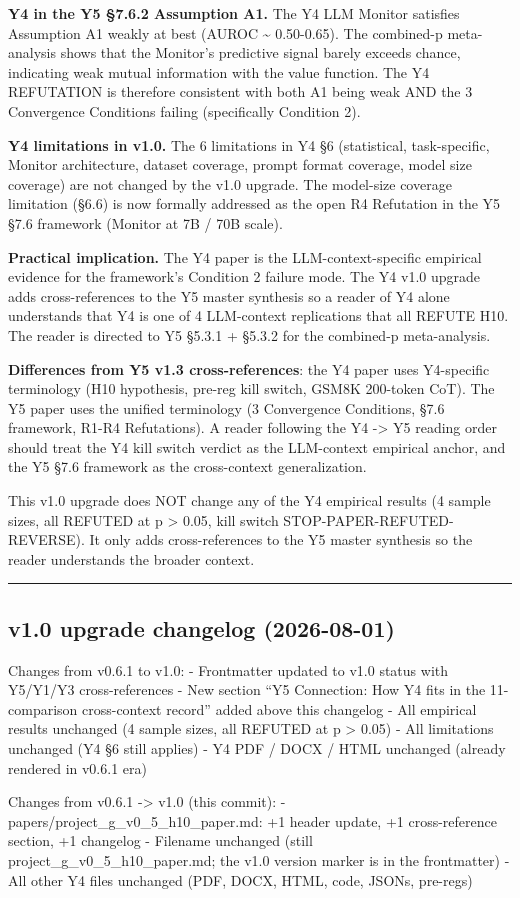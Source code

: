 \documentclass[
]{article}
\begin{document}
\textbf{Y4 in the Y5 §7.6.2 Assumption A1.} The Y4 LLM Monitor satisfies
Assumption A1 weakly at best (AUROC \textasciitilde{} 0.50-0.65). The
combined-p meta-analysis shows that the Monitor's predictive signal
barely exceeds chance, indicating weak mutual information with the value
function. The Y4 REFUTATION is therefore consistent with both A1 being
weak AND the 3 Convergence Conditions failing (specifically Condition
2).

\textbf{Y4 limitations in v1.0.} The 6 limitations in Y4 §6
(statistical, task-specific, Monitor architecture, dataset coverage,
prompt format coverage, model size coverage) are not changed by the v1.0
upgrade. The model-size coverage limitation (§6.6) is now formally
addressed as the open R4 Refutation in the Y5 §7.6 framework (Monitor at
7B / 70B scale).

\textbf{Practical implication.} The Y4 paper is the LLM-context-specific
empirical evidence for the framework's Condition 2 failure mode. The Y4
v1.0 upgrade adds cross-references to the Y5 master synthesis so a
reader of Y4 alone understands that Y4 is one of 4 LLM-context
replications that all REFUTE H10. The reader is directed to Y5 §5.3.1 +
§5.3.2 for the combined-p meta-analysis.

\textbf{Differences from Y5 v1.3 cross-references}: the Y4 paper uses
Y4-specific terminology (H10 hypothesis, pre-reg kill switch, GSM8K
200-token CoT). The Y5 paper uses the unified terminology (3 Convergence
Conditions, §7.6 framework, R1-R4 Refutations). A reader following the
Y4 -\textgreater{} Y5 reading order should treat the Y4 kill switch
verdict as the LLM-context empirical anchor, and the Y5 §7.6 framework
as the cross-context generalization.

This v1.0 upgrade does NOT change any of the Y4 empirical results (4
sample sizes, all REFUTED at p \textgreater{} 0.05, kill switch
STOP-PAPER-REFUTED-REVERSE). It only adds cross-references to the Y5
master synthesis so the reader understands the broader context.

\begin{center}\rule{0.5\linewidth}{0.5pt}\end{center}

\subsection{v1.0 upgrade changelog
(2026-08-01)}\label{v1.0-upgrade-changelog-2026-08-01}

Changes from v0.6.1 to v1.0: - Frontmatter updated to v1.0 status with
Y5/Y1/Y3 cross-references - New section ``Y5 Connection: How Y4 fits in
the 11-comparison cross-context record'' added above this changelog -
All empirical results unchanged (4 sample sizes, all REFUTED at p
\textgreater{} 0.05) - All limitations unchanged (Y4 §6 still applies) -
Y4 PDF / DOCX / HTML unchanged (already rendered in v0.6.1 era)

Changes from v0.6.1 -\textgreater{} v1.0 (this commit): -
papers/project\_g\_v0\_5\_h10\_paper.md: +1 header update, +1
cross-reference section, +1 changelog - Filename unchanged (still
project\_g\_v0\_5\_h10\_paper.md; the v1.0 version marker is in the
frontmatter) - All other Y4 files unchanged (PDF, DOCX, HTML, code,
JSONs, pre-regs)
\end{document}
